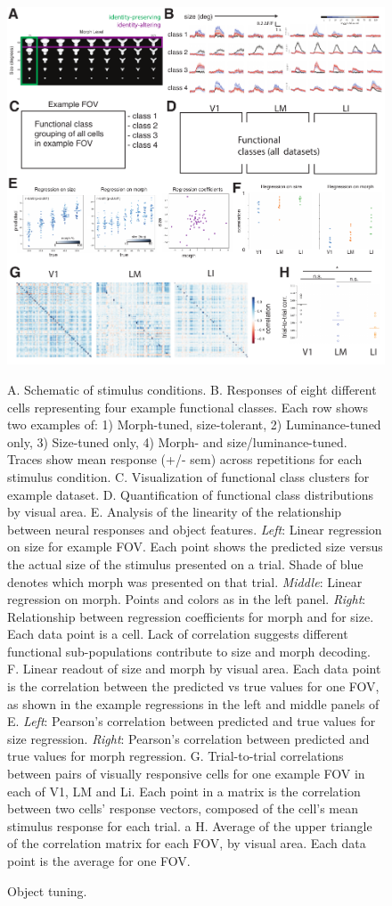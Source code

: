 \documentclass{article}
\begin{document}
\begin{figure}[ht]
  \includegraphics[width=\textwidth]{figures/objects.pdf}
  \caption{Object tuning.}
  \medskip
  \small
  A.  Schematic of stimulus conditions.
  B.  Responses of eight different cells representing four example functional classes.  Each row shows two examples of:  1)  Morph-tuned, size-tolerant, 2)  Luminance-tuned only, 3) Size-tuned only, 4)  Morph- and size/luminance-tuned. Traces show mean response (+/- sem) across repetitions for each stimulus condition.
  C.  Visualization of functional class clusters for example dataset.
  D.  Quantification of functional class distributions by visual area.
  E.  Analysis of the linearity of the relationship between neural responses and object features.  \textit{Left}:  Linear regression on size for example FOV. Each point shows the predicted size versus the actual size of the stimulus presented on a trial. Shade of blue denotes which morph was presented on that trial.  \textit{Middle}:  Linear regression on morph. Points and colors as in the left panel.  \textit{Right}:  Relationship between regression coefficients for morph and for size. Each data point is a cell. Lack of correlation suggests different functional sub-populations contribute to size and morph decoding.
  F.  Linear readout of size and morph by visual area. Each data point is the correlation between the predicted vs true values for one FOV, as shown in the example regressions in the left and middle panels of E.  \textit{Left}:  Pearson’s correlation between predicted and true values for size regression.  \textit{Right}:  Pearson’s correlation between predicted and true values for morph regression. 
  G.  Trial-to-trial correlations between pairs of visually responsive cells for one example FOV in each of V1, LM and Li. Each point in a matrix is the correlation between two cells’ response vectors, composed of the cell’s mean stimulus response for each trial. a
  H.  Average of the upper triangle of the correlation matrix for each FOV, by visual area. Each data point is the average for one FOV. 
  \label{fig:fig4}
\end{figure}
\end{document}
